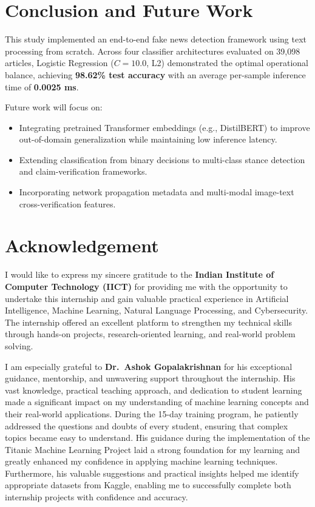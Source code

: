 \documentclass[conference]{IEEEtran}
\begin{document}
\section{Conclusion and Future Work}

This study implemented an end-to-end fake news detection framework using text processing from scratch. Across four classifier architectures evaluated on 39,098 articles, Logistic Regression ($C=10.0$, L2) demonstrated the optimal operational balance, achieving \textbf{98.62\% test accuracy} with an average per-sample inference time of \textbf{0.0025 ms}.

Future work will focus on:
\begin{itemize}
    \item Integrating pretrained Transformer embeddings (e.g., DistilBERT) to improve out-of-domain generalization while maintaining low inference latency.
    \item Extending classification from binary decisions to multi-class stance detection and claim-verification frameworks.
    \item Incorporating network propagation metadata and multi-modal image-text cross-verification features.
\end{itemize}

\section*{Acknowledgement}
I would like to express my sincere gratitude to the \textbf{Indian Institute of Computer Technology (IICT)} for providing me with the opportunity to undertake this internship and gain valuable practical experience in Artificial Intelligence, Machine Learning, Natural Language Processing, and Cybersecurity. The internship offered an excellent platform to strengthen my technical skills through hands-on projects, research-oriented learning, and real-world problem solving.

I am especially grateful to \textbf{Dr.~Ashok Gopalakrishnan} for his exceptional guidance, mentorship, and unwavering support throughout the internship. His vast knowledge, practical teaching approach, and dedication to student learning made a significant impact on my understanding of machine learning concepts and their real-world applications. During the 15-day training program, he patiently addressed the questions and doubts of every student, ensuring that complex topics became easy to understand. His guidance during the implementation of the Titanic Machine Learning Project laid a strong foundation for my learning and greatly enhanced my confidence in applying machine learning techniques. Furthermore, his valuable suggestions and practical insights helped me identify appropriate datasets from Kaggle, enabling me to successfully complete both internship projects with confidence and accuracy.
\end{document}
